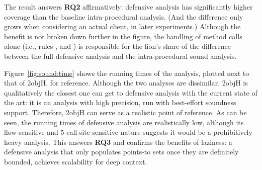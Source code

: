 The result answers \textbf{RQ2} affirmatively: defensive analysis has significantly higher coverage than the baseline intra-procedural analysis. (And the difference only grows when considering an actual client, in later experiments.) Although the benefit is not broken down further in the figure, the handling of method calls alone (i.e., rules ,  and ) is responsible for the lion's share of the difference between the full defensive analysis and the intra-procedural sound analysis.



Figure~\ref{fig:sound:time} shows the running times of the analysis, plotted next to that of 2objH, for reference. Although the two analyses are dissimilar, 2objH is qualitatively the closest one can get to defensive analysis with the current state of the art: it is an analysis with high precision, run with best-effort soundness support. Therefore, 2objH can serve as a realistic point of reference. As can be seen, the running times of defensive analysis are realistically low, although its flow-sensitive and 5-call-site-sensitive nature suggests it would be a prohibitively heavy analysis. This answers \textbf{RQ3} and confirms the benefits of laziness: a defensive analysis that only populates points-to sets once they are definitely bounded, achieves scalability for deep context.


